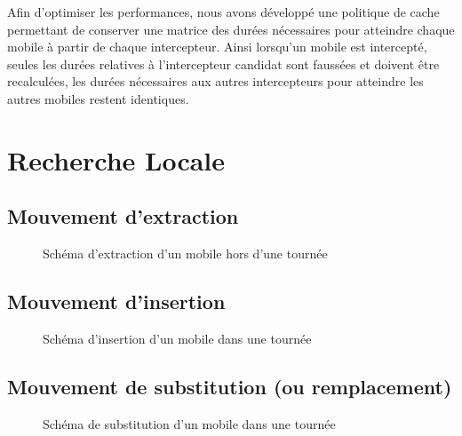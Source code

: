 			Afin d'optimiser les performances, nous avons développé une politique de cache permettant de conserver une matrice des durées nécessaires pour atteindre chaque mobile à partir de chaque intercepteur. Ainsi lorsqu'un mobile est intercepté, seules les durées relatives à l'intercepteur candidat sont faussées et doivent être recalculées, les durées nécessaires aux autres intercepteurs pour atteindre les autres mobiles restent identiques.

    \section{Recherche Locale}

		\subsection{Mouvement d'extraction}
			\begin{figure}[h!]
			\centering
			\begin{tikzpicture}[schema]
				
			\end{tikzpicture}
			\caption{Schéma d'extraction d'un mobile hors d'une tournée}
			\label{fig:move_extract}
			\end{figure}

		\subsection{Mouvement d'insertion}
			\begin{figure}[h!]
			\centering
			\begin{tikzpicture}[schema]
				
			\end{tikzpicture}
			\caption{Schéma d'insertion d'un mobile dans une tournée}
			\label{fig:move_insert}
			\end{figure}

		\subsection{Mouvement de substitution (ou remplacement)}
			\begin{figure}[h!]
			\centering
			\begin{tikzpicture}[schema]
				
			\end{tikzpicture}
			\caption{Schéma de substitution d'un mobile dans une tournée}
			\label{fig:move_replace}
			\end{figure}

